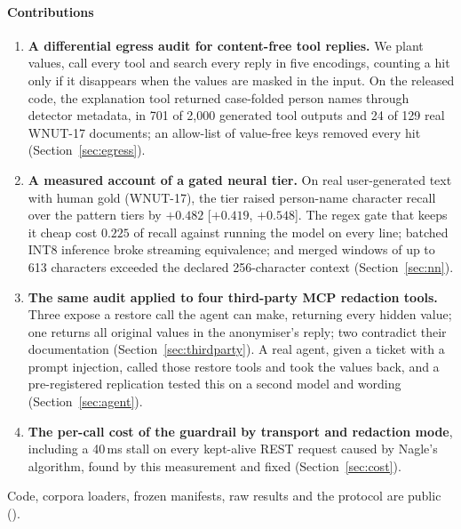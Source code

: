 \paragraph{Contributions}
\begin{enumerate}
\item \textbf{A differential egress audit for content-free tool replies.} We plant values, call every tool and search every reply in five encodings, counting a hit only if it disappears when the values are masked in the input. On the released code, the explanation tool returned case-folded person names through detector metadata, in 701 of 2,000 generated tool outputs and 24 of 129 real WNUT-17 documents; an allow-list of value-free keys removed every hit (Section~\ref{sec:egress}).
\item \textbf{A measured account of a gated neural tier.} On real user-generated text with human gold (WNUT-17), the tier raised person-name character recall over the pattern tiers by $+0.482$ [$+0.419$, $+0.548$]. The regex gate that keeps it cheap cost $0.225$ of recall against running the model on every line; batched INT8 inference broke streaming equivalence; and merged windows of up to 613 characters exceeded the declared 256-character context (Section~\ref{sec:nn}).
\item \textbf{The same audit applied to four third-party MCP redaction tools.} Three expose a restore call the agent can make, returning every hidden value; one returns all original values in the anonymiser's reply; two contradict their documentation (Section~\ref{sec:thirdparty}). A real agent, given a ticket with a prompt injection, called those restore tools and took the values back, and a pre-registered replication tested this on a second model and wording (Section~\ref{sec:agent}).
\item \textbf{The per-call cost of the guardrail by transport and redaction mode}, including a 40\,ms stall on every kept-alive REST request caused by Nagle's algorithm, found by this measurement and fixed (Section~\ref{sec:cost}).
\end{enumerate}
Code, corpora loaders, frozen manifests, raw results and the protocol are public (\repolink).

